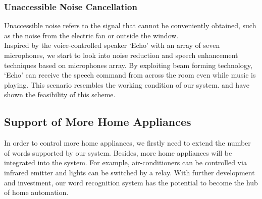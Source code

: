 
\subsubsection{Unaccessible Noise Cancellation}

Unaccessible noise refers to the signal that cannot be conveniently obtained, such as the noise from the electric fan or outside the window.\\

Inspired by the voice-controlled speaker `Echo' with an array of seven microphones, we start to look into noise reduction and speech enhancement techniques based on microphones array. By exploiting beam forming technology, `Echo' can receive the speech command from across the room even while music is playing. This scenario resembles the working condition of our system. \cite{mccowan2003microphone} and \cite{spalt2011background} have shown the feasibility of this scheme.


\subsection{Support of More Home Appliances}
In order to control more home appliances, we firstly need to extend the number of words supported by our system. Besides, more home appliances will be integrated into the system. For example, air-conditioners can be controlled via infrared emitter and lights can be switched by a relay. With further development and investment, our word recognition system has the potential to become the hub of home automation.
